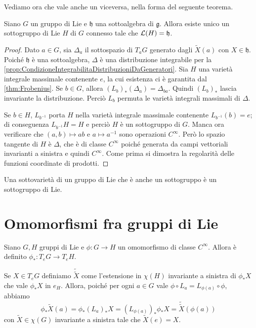 Vediamo ora che vale anche un viceversa, nella forma del seguente teorema.
\begin{theorem}
	Siano $G$ un gruppo di Lie e $\mathfrak h$ una sottoalgebra di $\mathfrak g$. Allora esiste unico un sottogruppo di Lie $H$ di $G$ connesso tale che $\mathcal L (H) = \mathfrak h$.
\end{theorem}
\begin{proof}
	Dato $a \in G$, sia $\Delta_a$ il sottospazio di $T_aG$ generato dagli $\tilde X(a)$ con $X\in \mathfrak h$.
	Poiché $\mathfrak h$ è una sottoalgebra, $\Delta$ è una distribuzione integrabile per la \cref{prop:CondizioneIntegrabilitaDistribuzioniDaGeneratori}.
	Sia $H$ una varietà integrale massimale contenente $e$, la cui esistenza ci è garantita dal \cref{thm:Frobenius}. Se $b \in G$, allora $(L_b)_* (\Delta_a) = \Delta_{ba}$. Quindi $(L_b)_*$ lascia invariante la distribuzione. Perciò $L_b$ permuta le varietà integrali massimali di $\Delta$.
	
	Se $b\in H$, $L_{b^{-1}}$ porta $H$ nella varietà integrale massimale contenente $L_{b^{-1}} (b) =e$; di conseguenza $L_{b^{-1}} H = H$ e perciò $H$ è un sottogruppo di $G$.
	Manca ora verificare che $(a,b) \mapsto ab$ e $a\mapsto a^{-1}$ sono operazioni $C^\infty$.
	Però lo spazio tangente di $H$ è $\Delta$, che è di classe $C^\infty$ poiché generata da campi vettoriali invarianti a sinistra e quindi $C^\infty$.
	Come prima si dimostra la regolarità delle funzioni coordinate di prodotti.
\end{proof}

\begin{remark}
	Una sottovarietà di un gruppo di Lie che è anche un sottogruppo è un sottogruppo di Lie.
\end{remark}

\section{Omomorfismi fra gruppi di Lie}

Siano $G,H$ gruppi di Lie e $\phi : G\to H$ un omomorfismo di classe $C^\infty$.
Allora è definito $\phi_* : T_eG \to T_eH$.

Se $X \in T_eG$ definiamo $\tilde{\tilde X}$ come l'estensione in $\chi(H)$ invariante a sinistra di $\phi_*X $ che vale $\phi_*X$ in $e_H$.
Allora, poiché per ogni $a \in G$ vale $\phi \circ L_a = L_{\phi(a)} \circ \phi$, abbiamo 
\begin{equation*}
\phi_* \tilde X(a) = \phi_* (L_a)_*X = (L_{\phi(a)})_* \phi_*X = \tilde{\tilde X} (\phi(a))
\end{equation*}
con $\tilde X\in\chi(G)$ invariante a sinistra tale che $\tilde X(e) = X$.

